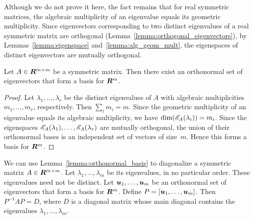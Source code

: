 Although we do not prove it here, the fact remains that for real symmetric
matrices, the algebraic multiplicity of an eigenvalue equals its geometric
multiplicity.  Since eigenvectors corresponding to two distinct eigenvalues of
a real symmetric matrix are orthogonal
(Lemma~\ref{lemma:orthogonal_eigenvectors}), by Lemmas~\ref{lemma:eigenspace}
and~\ref{lemma:alg_geom_mult}, the eigenspaces of distinct eigenvectors are
mutually orthogonal.
\begin{lemma}\label{lemma:orthonormal_basis}
Let $A \in \bm{R}^{m \times m}$ be a symmetric matrix. Then there exist an
orthonormal set of eigenvectors that form a basis for $\bm{R}^m$.
\end{lemma}
\begin{proof}
Let $\lambda_1, \ldots, \lambda_r$ be the distinct eigenvalues of $A$ with
algebraic multiplicities $m_1, \ldots, m_r$, respectively. Then $\sum_i m_i =
m$. Since the geometric multiplicity of an eigenvalue equals its algebraic
multiplicity, we have $\dim(\mathscr{E}_{A}(\lambda_i)) = m_i$.  Since the
eigenspaces $\mathscr{E}_{A}(\lambda_1), \ldots, \mathscr{E}_{A}(\lambda_r)$ are
mutually orthogonal, the union of their orthonormal bases is an independent set
of vectors of size~$m$.  Hence this forms a basis for $\bm{R}^m$.
\end{proof}

We can use Lemma~\ref{lemma:orthonormal_basis} to diagonalize a symmetric
matrix $A \in \bm{R}^{m \times m}$.  Let $\lambda_1, \ldots, \lambda_m$ be its
eigenvalues, in no particular order. These eigenvalues need not be distinct.
Let $\boldsymbol{u}_1, \ldots, \boldsymbol{u}_m$ be an orthonormal set of eigenvectors that
form a basis for $\bm{R}^m$. Define $P = [\boldsymbol{u}_1, \ldots, \boldsymbol{u}_m]$. Then
$P^{-1} A P = D$, where $D$ is a diagonal matrix whose main diagonal contains
the eigenvalues $\lambda_1, \ldots, \lambda_m$.

